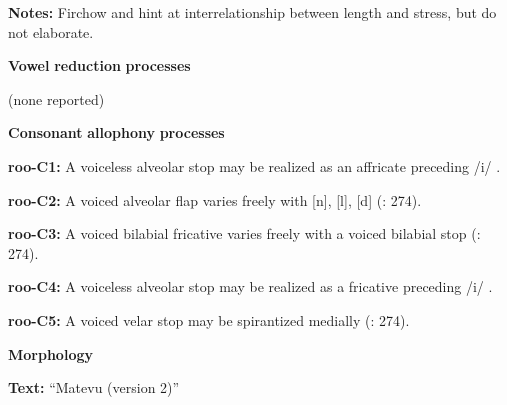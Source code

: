 \begin{styleBody}
\textbf{Notes:} Firchow and \citet[271]{Firchow1969} hint at interrelationship between length and stress, but do not elaborate.
\end{styleBody}

\begin{styleBody}
\textbf{Vowel} \textbf{reduction} \textbf{processes}
\end{styleBody}

\begin{styleBody}
(none reported)
\end{styleBody}

\begin{styleBody}
\textbf{Consonant} \textbf{allophony} \textbf{processes}
\end{styleBody}

\begin{styleBody}
\textbf{roo-C1:} A voiceless alveolar stop may be realized as an affricate preceding /i/ \citep[28]{Robinson2011}.
\end{styleBody}

\begin{styleBody}
\textbf{roo-C2:} A voiced alveolar flap varies freely with [n], [l], [d] (\citealt{FirchowFirchow1969}: 274).
\end{styleBody}

\begin{styleBody}
\textbf{roo-C3:} A voiced bilabial fricative varies freely with a voiced bilabial stop (\citealt{FirchowFirchow1969}: 274).
\end{styleBody}

\begin{styleBody}
\textbf{roo-C4:} A voiceless alveolar stop may be realized as a fricative preceding /i/ \citep[28]{Robinson2011}.
\end{styleBody}

\begin{styleBody}
\textbf{roo-C5:} A voiced velar stop may be spirantized medially (\citealt{FirchowFirchow1969}: 274).
\end{styleBody}

\begin{styleBody}
\textbf{Morphology}
\end{styleBody}

\begin{styleBody}
\textbf{Text:} “Matevu (version 2)” \citep[293-304]{Robinson2011}
\end{styleBody}

